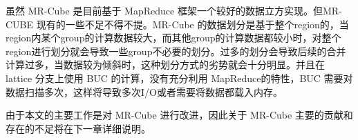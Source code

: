 虽然 MR-Cube 是目前基于 MapReduce 框架一个较好的数据立方实现。但MR-CUBE 现有的一些不足不得不提。MR-Cube 的数据划分是基于整个region的，当region内某个group的计算数据较大，而其他group的计算数据都较小时，对整个region进行划分就会导致一些group不必要的划分。过多的划分会导致后续的合并计算过多，当数据较为倾斜时，这种划分方式的劣势就会十分明显。并且在 lattice 分支上使用 BUC 的计算，没有充分利用 MapReduce的特性，BUC 需要对数据扫描多次，这样将导致多次I/O或者需要将数据都载入内存。

由于本文的主要工作是对 MR-Cube 进行改进，因此关于 MR-Cube 主要的贡献和存在的不足将在下一章详细说明。



